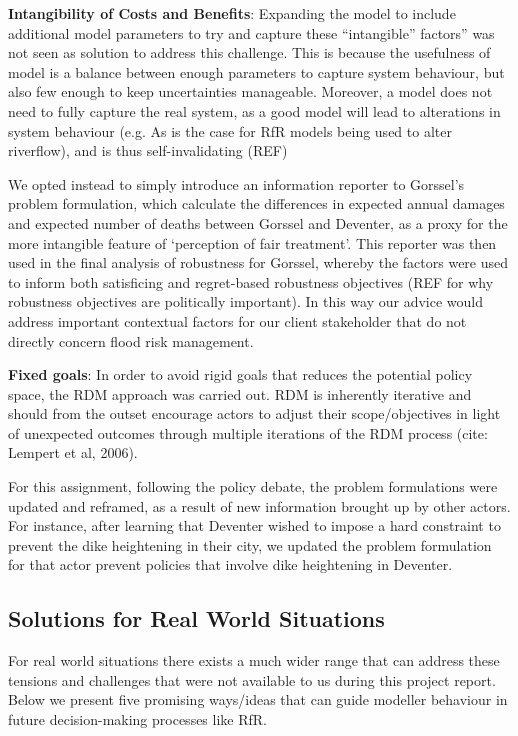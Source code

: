 \textbf{Intangibility of Costs and Benefits}: Expanding the model to include additional model parameters to try and capture these “intangible” factors” was not seen as solution to address this challenge. This is because the usefulness of model is a balance between enough parameters to capture system behaviour, but also few enough to keep uncertainties manageable. Moreover, a model does not need to fully capture the real system, as a good model will lead to alterations in system behaviour (e.g. As is the case for RfR models being used to alter riverflow), and is thus self-invalidating (REF) 

We opted instead to simply introduce an information reporter to Gorssel’s problem formulation, which calculate the differences in expected annual damages and expected number of deaths between Gorssel and Deventer, as a proxy for the more intangible feature of ‘perception of fair treatment’. This reporter was then used in the final analysis of robustness for Gorssel, whereby the factors were used to inform both satisficing and regret-based robustness objectives (REF for why robustness objectives are politically important). In this way our advice would address important contextual factors for our client stakeholder that do not directly concern flood risk management. 

\textbf{Fixed goals}: In order to avoid rigid goals that reduces the potential policy space, the RDM approach was carried out. RDM is inherently iterative and should from the outset encourage actors to adjust their scope/objectives in light of unexpected outcomes through multiple iterations of the RDM process (cite: Lempert et al, 2006). 

For this assignment, following the policy debate, the problem formulations were updated and reframed, as a result of new information brought up by other actors. For instance, after learning that Deventer wished to impose a hard constraint to prevent the dike heightening in their city, we updated the problem formulation for that actor prevent policies that involve dike heightening in Deventer. 

\subsection{Solutions for Real World Situations }

For real world situations there exists a much wider range that can address these tensions and challenges that were not available to us during this project report. Below we present five promising ways/ideas that can guide modeller behaviour in future decision-making processes like RfR.

